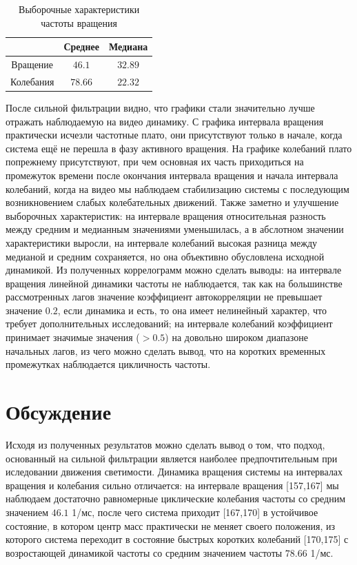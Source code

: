 \documentclass[a4paper,12pt]{article} %
\begin{document}
	\begin{table}[H]
		\caption{Выборочные характеристики частоты вращения}
		\label{tab:my_label4}
		\begin{center}
			\vspace{5mm}
			\begin{tabular}{|c|c|c|}
				\hline
				& Среднее & Медиана\\
				\hline
				Вращение & $ 46.1 $ & $ 32.89 $\\
				\hline
				Колебания & $ 78.66 $ & $ 22.32 $\\
				\hline
			\end{tabular}
		\end{center}
	\end{table}
	
	После сильной фильтрации видно, что графики стали значительно лучше отражать наблюдаемую на видео динамику. С графика интервала вращения практически исчезли частотные плато, они присутствуют только в начале, когда система ещё не перешла в фазу активного вращения. На графике колебаний плато попрежнему присутствуют, при чем основная их часть приходиться на промежуток времени после окончания интервала вращения и начала интервала колебаний, когда на видео мы наблюдаем стабилизацию системы с последующим возникновением слабых колебательных движений. 
	\newline Также заметно и улучшение выборочных характеристик: на интервале вращения относительная разность между средним и медианным значениями уменьшилась, а в абслотном значении характеристики выросли, на интервале колебаний высокая разница между медианой и средним сохраняется, но она объективно обусловлена исходной динамикой.
	\newline Из полученных коррелограмм можно сделать выводы: на интервале вращения линейной динамики частоты не наблюдается, так как на большинстве рассмотренных лагов значение коэффициент автокорреляции не превышает значение $0.2$, если динамика и есть, то она имеет нелинейный характер, что требует дополнительных исследований; на интервале колебаний коэффициент принимает значимые значения ($>0.5$) на довольно широком диапазоне начальных лагов, из чего можно сделать вывод, что на коротких временных промежутках наблюдается цикличность частоты. 
	\section{Обсуждение}
	Исходя из полученных результатов можно сделать вывод о том, что подход, основанный на сильной фильтрации является наиболее предпочтительным при иследовании движения светимости. 
	\newline Динамика вращения системы на интервалах вращения и колебания сильно отличается: на интервале вращения [157,167] мы наблюдаем достаточно равномерные циклические колебания частоты со средним значением $46.1$ 1/мс, после чего система приходит [167,170] в устойчивое состояние, в котором центр масс практически не меняет своего положения, из которого система переходит в состояние быстрых коротких колебаний [170,175] с возростающей динамикой частоты со средним значением частоты $78.66$ 1/мс.
\end{document}

